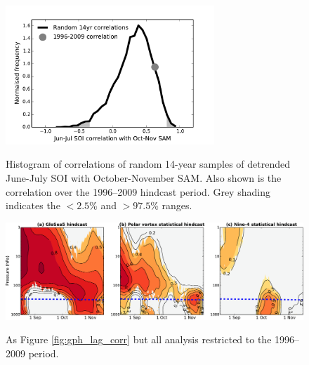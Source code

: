 \begin{figure}[t]
  \noindent\includegraphics[width=0.7\textwidth,angle=0]{figures/chapter-seasonal/SAM_SOI_corr.pdf}\\
  \caption[Correlation of the SOI with the SAM.]{Histogram of correlations of
    random 14-year samples of detrended June-July SOI with October-November
    SAM. Also shown is the correlation over the 1996--2009 hindcast period. Grey
  shading indicates the $<2.5$\% and $>97.5$\% ranges.}\label{fig:sam_soi_corr}
\end{figure}

\begin{figure}[t]
  \noindent\includegraphics[width=\textwidth,angle=0]{figures/chapter-seasonal/lag_height_short.pdf}\\
  \caption[Lag-height correlation of GloSea5 polar cap geopotential height]{As
    Figure \ref{fig:gph_lag_corr} but all analysis restricted to the 1996--2009
    period.}\label{fig:lag_height_short}
\end{figure}




